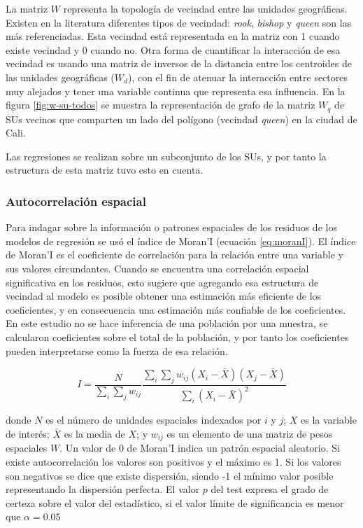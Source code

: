 \documentclass[12pt,a4paper,openany]{book}
\theoremstyle{definition}
\theoremstyle{definition}
\theoremstyle{definition}
\theoremstyle{remark}
\begin{document}
La matriz \(W\) representa la topología de vecindad entre las unidades
geográficas. Existen en la literatura diferentes tipos de vecindad:
\emph{rook}, \emph{bishop} y \emph{queen} son las más referenciadas.
Esta vecindad está representada en la matriz con 1 cuando existe
vecindad y 0 cuando no. Otra forma de cuantificar la interacción de esa
vecindad es usando una matriz de inversos de la distancia entre los
centroides de las unidades geográficas (\(W_d\)), con el fin de atenuar
la interacción entre sectores muy alejados y tener una variable continua
que representa esa influencia. En la figura \ref{fig:w-su-todos} se
muestra la representación de grafo de la matriz \(W_q\) de SUs vecinos
que comparten un lado del polígono (vecindad \emph{queen}) en la ciudad
de Cali.

Las regresiones se realizan sobre un subconjunto de los SUs, y por tanto
la estructura de esta matriz tuvo esto en cuenta.

\subsubsection{Autocorrelación
espacial}\label{autocorrelaciuxf3n-espacial}

Para indagar sobre la información o patrones espaciales de los residuos
de los modelos de regresión se usó el índice de Moran'I (ecuación
\eqref{eq:moranI}). El índice de Moran'I es el coeficiente de correlación
para la relación entre una variable y sus valores circundantes. Cuando
se encuentra una correlación espacial significativa en los residuos,
esto sugiere que agregando esa estructura de vecindad al modelo es
posible obtener una estimación más eficiente de los coeficientes, y en
consecuencia una estimación más confiable de los coeficientes. En este
estudio no se hace inferencia de una población por una muestra, se
calcularon coeficientes sobre el total de la población, y por tanto los
coeficientes pueden interpretarse como la fuerza de esa relación.

\begin{equation}
 I=\frac {N}{\sum _{i}\sum _{j}w_{ij}} \frac {\sum _{i}\sum _{j}w_{ij}(X_{i}-{\bar {X}})(X_{j}-{\bar {X}})}{\sum _{i}(X_{i}- \bar{X})^{2}}
\label{eq:moranI}
\end{equation}

donde \(N\) es el número de unidades espaciales indexados por \(i\) y
\(j\); \(X\) es la variable de interés; \(\bar {X}\) es la media de
\(X\); y \(w_{ij}\) es un elemento de una matriz de pesos espaciales
\(W\). Un valor de 0 de Moran'I indica un patrón espacial aleatorio. Si
existe autocorrelación los valores son positivos y el máximo es 1. Si
los valores son negativos se dice que existe dispersión, siendo -1 el
mínimo valor posible representando la dispersión perfecta. El valor
\textbf{\(p\)} del test expresa el grado de certeza sobre el valor del
estadístico, si el valor límite de significancia es menor que
\(\alpha = 0.05\)
\end{document}
